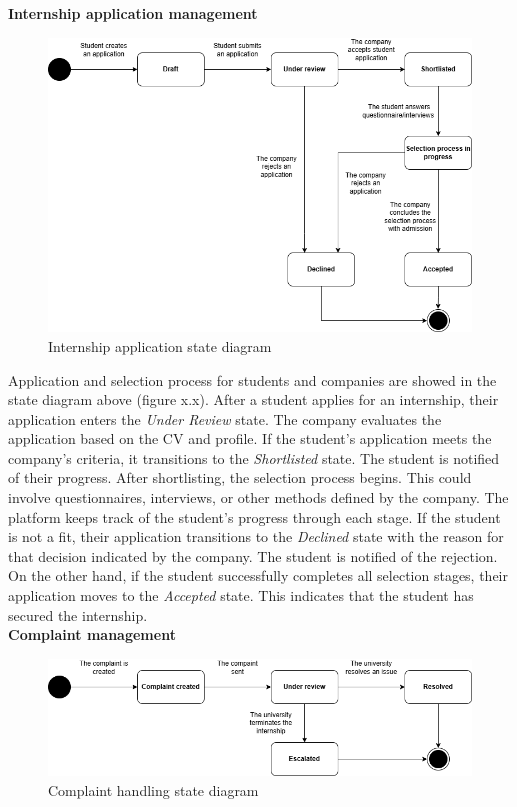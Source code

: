 \textbf{Internship application management}\\
\begin{figure}[H]
	\includegraphics[width=\textwidth,height=\textheight,keepaspectratio]{RASD-Latex/assets/state_diagram_2.png}
	\caption{Internship application state diagram}
	\label{fig:DataRequest}
\end{figure}

Application and selection process for students and companies are showed in the state diagram above (figure x.x). After a student applies for an internship, their application enters the \textit{Under Review} state. The company evaluates the application based on the CV and profile. If the student’s application meets the company’s criteria, it transitions to the \textit{Shortlisted} state. The student is notified of their progress. After shortlisting, the selection process begins. This could involve questionnaires, interviews, or other methods defined by the company. The platform keeps track of the student's progress through each stage. If the student is not a fit, their application transitions to the \textit{Declined} state with the reason for that decision indicated by the company. The student is notified of the rejection. On the other hand, if the student successfully completes all selection stages, their application moves to the \textit{Accepted} state. This indicates that the student has secured the internship. \\

\textbf{Complaint management}\\
\begin{figure}[H]
	\includegraphics[width=\textwidth,height=\textheight,keepaspectratio]{RASD-Latex/assets/state_diagram_3.png}
	\caption{Complaint handling state diagram}
	\label{fig:DataRequest}
\end{figure}

